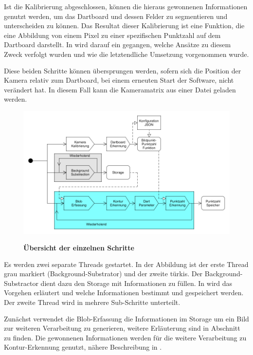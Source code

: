 Ist die Kalibrierung abgeschlossen, können die hieraus gewonnenen Informationen genutzt werden, um das Dartboard und dessen Felder zu segmentieren und unterscheiden zu können. Das Resultat dieser Kalibrierung ist eine Funktion, die eine Abbildung von einem Pixel zu einer spezifischen Punktzahl auf dem Dartboard darstellt. In  wird darauf ein gegangen, welche Ansätze zu diesem Zweck verfolgt wurden und wie die letztendliche Umsetzung vorgenommen wurde.

Diese beiden Schritte können übersprungen werden, sofern sich die Position der Kamera relativ zum Dartboard, bei einem erneuten Start der Software, nicht verändert hat. In diesem Fall kann die Kameramatrix aus einer Datei geladen werden.
\begin{figure}
\includegraphics[width=\textwidth]{media/pipeline.png}\\
\caption{\textbf{Übersicht der einzelnen Schritte}}
\label{Fig:pipeline}
\end{figure}
Es werden zwei separate Threads gestartet. In der Abbildung ist der erste Thread grau markiert (Background-Substrator) und der zweite türkis. Der Background-Substractor dient dazu den Storage mit Informationen zu füllen. In  wird das Vorgehen erläutert und welche Informationen bestimmt und gespeichert werden.
Der zweite Thread wird in mehrere Sub-Schritte unterteilt. 

Zunächst verwendet die Blob-Erfassung die Informationen im Storage um ein Bild zur weiteren Verarbeitung zu generieren, weitere Erläuterung sind in Abschnitt  zu finden.
Die gewonnenen Informationen werden für die weitere Verarbeitung zu Kontur-Erkennung genutzt, nähere Beschreibung in .

